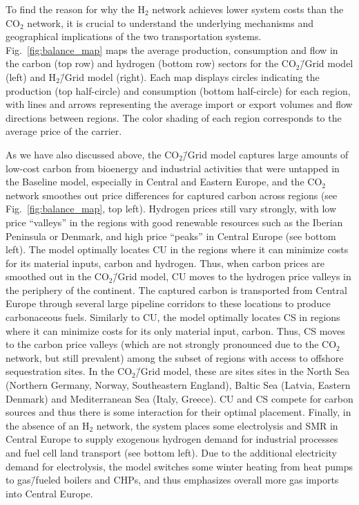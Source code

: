 \documentclass[twocolumn]{article}
\newcommand{\COtwo}{CO$_2$}
\newcommand{\Htwo}{H$_2$}
\newcommand{\modBase}{Baseline model}
\newcommand{\modCO}{CO$_2$\=/Grid model}
\newcommand{\modH}{H$_2$\=/Grid model}
\begin{document}
To find the reason for why the \Htwo{} network achieves lower system costs than the \COtwo{} network, it is crucial to understand the underlying mechanisms and geographical implications of the two transportation systems. Fig.~\ref{fig:balance_map} maps the average production, consumption and flow in the carbon (top row) and hydrogen (bottom row) sectors for the \modCO{} (left) and \modH{} (right). Each map displays circles indicating the production (top half-circle) and consumption (bottom half-circle) for each region, with lines and arrows representing the average import or export volumes and flow directions between regions. The color shading of each region corresponds to the average price of the carrier.

As we have also discussed above, the \modCO{} captures large amounts of low-cost carbon from bioenergy and industrial activities that were untapped in the \modBase{}, especially in Central and Eastern Europe, and the \COtwo{} network smoothes out price differences for captured carbon across regions (see Fig.~\ref{fig:balance_map}, top left). Hydrogen prices still vary strongly, with low price ``valleys'' in the regions with good renewable resources such as the Iberian Peninsula or Denmark, and high price ``peaks'' in Central Europe (see bottom left). The model optimally locates CU in the regions where it can minimize costs for its material inputs, carbon and hydrogen. Thus, when carbon prices are smoothed out in the \modCO{}, CU moves to the hydrogen price valleys in the periphery of the continent. The captured carbon is transported from Central Europe through several large pipeline corridors to these locations to produce carbonaceous fuels.
Similarly to CU, the model optimally locates CS in regions where it can minimize costs for its only material input, carbon. Thus, CS moves to the carbon price valleys (which are not strongly pronounced due to the \COtwo{} network, but still prevalent) among the subset of regions with access to offshore sequestration sites. In the \modCO, these are sites  sites in the North Sea (Northern Germany, Norway, Southeastern England), Baltic Sea (Latvia, Eastern Denmark) and Mediterranean Sea (Italy, Greece). CU and CS compete for carbon sources and thus there is some interaction for their optimal placement.
Finally, in the absence of an \Htwo{} network, the system places some electrolysis and SMR in Central Europe to supply exogenous hydrogen demand for industrial processes and fuel cell land transport (see bottom left). Due to the additional electricity demand for electrolysis, the model switches some winter heating from heat pumps to gas\=/fueled boilers and CHPs, and thus emphasizes overall more gas imports into Central Europe.
\end{document}

